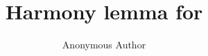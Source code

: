 \documentclass[runningheads,orivec]{llncs}
\title{Harmony lemma for \lqCCS}
\author{Anonymous Author}
\institute{Anonymous Institution}
\newif\ifshowappendix%
\begin{document}
\maketitle

\begin{abstract}
\end{abstract}

\appendix
\ifshowappendix%
%
%
\fi
%
\end{document}
